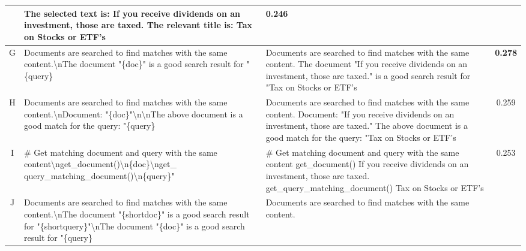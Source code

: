 \documentclass{article}
\begin{document}
\begin{table*}[htbp]
{\begin{tabular}{c|p{55mm}|p{75mm}|c}
    & The selected text is:\newline
    If you receive dividends on an investment, those are taxed.
    \newline\newline
    The relevant title is:\newline
    Tax on Stocks or ETF's 
    & 0.246
    \\
    \midrule
    G
    & Documents are searched to find matches with the same content.\textbackslash nThe document "\{doc\}" is a good search result for "\{query\}
    & Documents are searched to find matches with the same content.\newline
    The document "If you receive dividends on an investment, those are taxed." is a good search result for "Tax on Stocks or ETF's
    & \textbf{0.278}
    \\
    \midrule
    H & 
    Documents are searched to find matches with the same content.\textbackslash nDocument: "\{doc\}"\textbackslash n\textbackslash nThe above document is a good match for the query: "\{query\}
    &
    Documents are searched to find matches with the same content.
    \newline
    Document: "If you receive dividends on an investment, those are taxed."
    \newline
    \newline
    The above document is a good match for the query: "Tax on Stocks or ETF's
    &  0.259
    \\
    \midrule
    I & \# Get matching document and query with the same content\textbackslash nget\_document()\textbackslash n\{doc\}\textbackslash nget\_ query\_matching\_document()\textbackslash n\{query\}"
    & \# Get matching document and query with the same content
    \newline
    get\_document()
    \newline
    If you receive dividends on an investment, those are taxed. 
    \newline
    get\_query\_matching\_document()
    \newline
    Tax on Stocks or ETF's
    &  0.253
    \\
    \midrule
    J &
    Documents are searched to find matches with the same content.\textbackslash nThe document "\{shortdoc\}" is a good search result for "\{shortquery\}"\textbackslash nThe document "\{doc\}" is a good search result for "\{query\}
    & 
    Documents are searched to find matches with the same content.
    \newline

\end{tabular}}
\end{table*}
\end{document}
